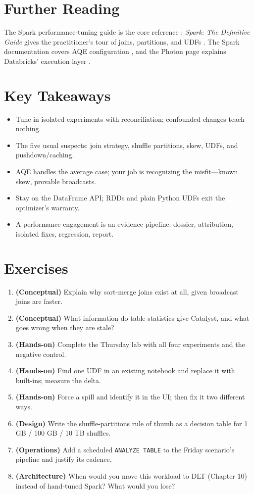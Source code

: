 \section{Further Reading}
The Spark performance-tuning guide is the core reference \cite{sparkSQLTuning}; \textit{Spark: The Definitive Guide} gives the practitioner's tour of joins, partitions, and UDFs \cite{chambersZaharia}. The Spark documentation covers AQE configuration \cite{sparkDocs}, and the Photon page explains Databricks' execution layer \cite{databricksPhoton}.

\section*{Key Takeaways}
\begin{itemize}
    \item Tune in isolated experiments with reconciliation; confounded changes teach nothing.
    \item The five usual suspects: join strategy, shuffle partitions, skew, UDFs, and pushdown/caching.
    \item AQE handles the average case; your job is recognizing the misfit---known skew, provable broadcasts.
    \item Stay on the DataFrame API; RDDs and plain Python UDFs exit the optimizer's warranty.
    \item A performance engagement is an evidence pipeline: dossier, attribution, isolated fixes, regression, report.
\end{itemize}

\section{Exercises}
\begin{enumerate}
    \item \textbf{(Conceptual)} Explain why sort-merge joins exist at all, given broadcast joins are faster.
    \item \textbf{(Conceptual)} What information do table statistics give Catalyst, and what goes wrong when they are stale?
    \item \textbf{(Hands-on)} Complete the Thursday lab with all four experiments and the negative control.
    \item \textbf{(Hands-on)} Find one UDF in an existing notebook and replace it with built-ins; measure the delta.
    \item \textbf{(Hands-on)} Force a spill and identify it in the UI; then fix it two different ways.
    \item \textbf{(Design)} Write the shuffle-partitions rule of thumb as a decision table for 1 GB / 100 GB / 10 TB shuffles.
    \item \textbf{(Operations)} Add a scheduled \texttt{ANALYZE TABLE} to the Friday scenario's pipeline and justify its cadence.
    \item \textbf{(Architecture)} When would you move this workload to DLT (Chapter 10) instead of hand-tuned Spark? What would you lose?
\end{enumerate}
